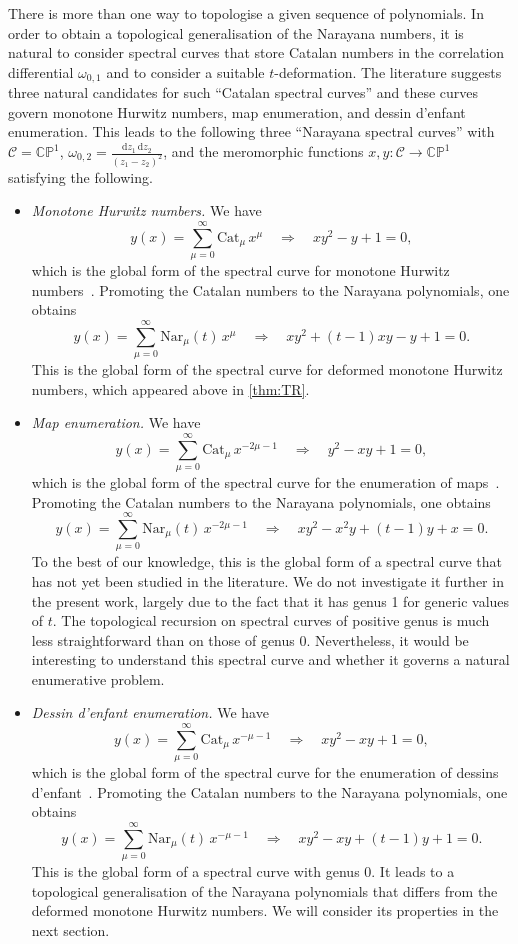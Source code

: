 \documentclass[a4paper]{article}
\theoremstyle{plain}
\numberwithin{theorem}{section}
\theoremstyle{definition}
\theoremstyle{remark}
\newcommand{\dd}{\mathrm{d}}
\begin{document}
There is more than one way to topologise a given sequence of polynomials. In order to obtain a topological generalisation of the Narayana numbers, it is natural to consider spectral curves that store Catalan numbers in the correlation differential $\omega_{0,1}$ and to consider a suitable $t$-deformation. The literature suggests three natural candidates for such ``Catalan spectral curves'' and these curves govern monotone Hurwitz numbers, map enumeration, and dessin d'enfant enumeration. This leads to the following three ``Narayana spectral curves'' with $\mathcal{C} = \mathbb{CP}^1$, $\omega_{0,2} = \frac{\dd z_1 \, \dd z_2}{(z_1 - z_2)^2}$, and the meromorphic functions $x, y: \mathcal{C} \to \mathbb{CP}^1$ satisfying the following.
\begin{itemize}
\item {\em Monotone Hurwitz numbers.} We have
\[
y(x) = \sum_{\mu=0}^\infty \mathrm{Cat}_\mu \, x^\mu \quad \Rightarrow \quad x y^2 - y + 1 = 0,
\]
which is the global form of the spectral curve for monotone Hurwitz numbers~\cite{do-dye-mat17}. Promoting the Catalan numbers to the Narayana polynomials, one obtains
\[
y(x) = \sum_{\mu=0}^\infty \mathrm{Nar}_\mu(t) \, x^\mu \quad \Rightarrow \quad xy^2 + (t-1)xy - y + 1 = 0.
\]
This is the global form of the spectral curve for deformed monotone Hurwitz numbers, which appeared above in \cref{thm:TR}.


\item {\em Map enumeration.} We have
\[
y(x) = \sum_{\mu=0}^\infty \mathrm{Cat}_\mu \, x^{-2\mu-1} \quad \Rightarrow \quad y^2 - xy + 1 = 0,
\]
which is the global form of the spectral curve for the enumeration of maps~\cite{che-eyn06, eyn-ora07}. Promoting the Catalan numbers to the Narayana polynomials, one obtains
\[
y(x) = \sum_{\mu=0}^\infty \mathrm{Nar}_\mu(t) \, x^{-2\mu-1} \quad \Rightarrow \quad xy^2 - x^2y + (t-1) y + x = 0.
\]
To the best of our knowledge, this is the global form of a spectral curve that has not yet been studied in the literature. We do not investigate it further in the present work, largely due to the fact that it has genus 1 for generic values of $t$. The topological recursion on spectral curves of positive genus is much less straightforward than on those of genus 0. Nevertheless, it would be interesting to understand this spectral curve and whether it governs a natural enumerative problem.


\item {\em Dessin d'enfant enumeration.} We have
\[
y(x) = \sum_{\mu=0}^\infty \mathrm{Cat}_\mu \, x^{-\mu-1} \quad \Rightarrow \quad x y^2 - x y + 1 = 0,
\]
which is the global form of the spectral curve for the enumeration of dessins d'enfant~\cite{do-nor18, kaz-zog15}. Promoting the Catalan numbers to the Narayana polynomials, one obtains
\[
y(x) = \sum_{\mu=0}^\infty \mathrm{Nar}_\mu(t) \, x^{-\mu-1} \quad \Rightarrow \quad x y^2 - x y + (t-1)y + 1 = 0.
\]
This is the global form of a spectral curve with genus 0. It leads to a topological generalisation of the Narayana polynomials that differs from the deformed monotone Hurwitz numbers. We will consider its properties in the next section.
\end{itemize}
\end{document}
